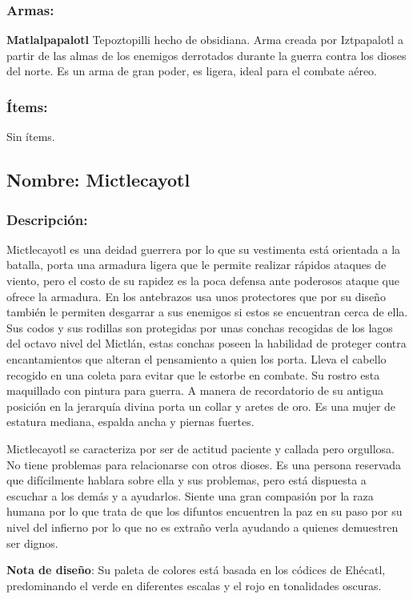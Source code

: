 \documentclass[11pt,letterpaper]{article}
\begin{document}
\subsubsection{Armas:}
\textbf{Matlalpapalotl} Tepoztopilli hecho de obsidiana. Arma creada por Iztpapalotl a partir de las almas de los enemigos derrotados durante la guerra contra los dioses del norte. Es un arma de gran poder, es ligera, ideal para el combate aéreo.
\subsubsection{Ítems:}
Sin ítems.



\subsection{Nombre: Mictlecayotl}  

\subsubsection{Descripción:}
Mictlecayotl es una deidad guerrera por lo que su vestimenta está orientada a la batalla, porta una armadura ligera que le permite realizar rápidos ataques de viento, pero el costo de su rapidez es la poca defensa ante poderosos ataque que ofrece la armadura. En los antebrazos usa unos protectores que por su diseño también le permiten desgarrar a sus enemigos si estos se encuentran cerca de ella. Sus codos y sus rodillas son protegidas por unas conchas recogidas de los lagos del octavo nivel del Mictlán, estas conchas poseen la habilidad de proteger contra encantamientos que alteran el pensamiento a quien los porta. Lleva el cabello recogido en una coleta para evitar que le estorbe en combate. Su rostro esta maquillado con pintura para guerra. A manera de recordatorio de su antigua posición en la jerarquía divina porta un collar y aretes de oro. Es una mujer de estatura mediana, espalda ancha y piernas fuertes. 
\\
\par
Mictlecayotl se caracteriza por ser de actitud paciente y callada pero orgullosa. No tiene problemas para relacionarse con otros dioses. Es una persona reservada que difícilmente hablara sobre ella y sus problemas, pero está dispuesta a escuchar a los demás y a ayudarlos. Siente una gran compasión por la raza humana por lo que trata de que los difuntos encuentren la paz en su paso por su nivel del infierno por lo que no es extraño verla ayudando a quienes demuestren ser dignos.  
\\
\par
\textbf{Nota de diseño}: Su paleta de colores está basada en los códices de Ehécatl, predominando el verde en diferentes escalas y el rojo en tonalidades oscuras. 	  
\end{document}
